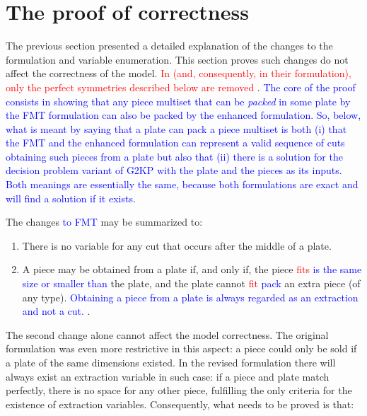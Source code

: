 \documentclass[ppgc,tese,english,formais,babel]{iiufrgs}
\newif\iffinalversion
\newcommand{\newtext}[1]{\iffinalversion%
#1%
\else%
\textcolor{blue}{#1}%
\fi%
}
\newcommand{\oldtext}[1]{\iffinalversion%
\else%
\textcolor{red}{#1}%
\fi%
}
\begin{document}

\section{The proof of correctness}
\label{sec:proof_of_correctness}

The previous section presented a detailed explanation of the changes to the formulation and variable enumeration.
This section proves such changes do not affect the correctness of the model.
\oldtext{In \citet{furini:2016} (and, consequently, in their formulation), only the perfect symmetries described below are removed}.
\newtext{The core of the proof consists in showing that any piece multiset that can be \emph{packed} in some plate by the FMT formulation can also be packed by the enhanced formulation. So, below, what is meant by saying that a plate can pack a piece multiset is both (i) that the FMT and the enhanced formulation can represent a valid sequence of cuts obtaining such pieces from a plate but also that (ii) there is a solution for the decision problem variant of G2KP with the plate and the pieces as its inputs. Both meanings are essentially the same, because both formulations are exact and will find a solution if it exists.}
The changes \newtext{to FMT} may be summarized to:

\begin{enumerate}
\item There is no variable for any cut that occurs after the middle of a plate.
\item A piece may be obtained from a plate if, and only if, the piece \oldtext{fits}\newtext{is the same size or smaller than} the plate, and the plate cannot \oldtext{fit}\newtext{pack} an extra piece (of any type). \newtext{Obtaining a piece from a plate is always regarded as an extraction and not a cut.}.
\end{enumerate}

The second change alone cannot affect the model correctness.
The original formulation was even more restrictive in this aspect:
a piece could only be sold if a plate of the same dimensions existed.
In the revised formulation there will always exist an extraction variable in such case:
if a piece and plate match perfectly, there is no space for any other piece, fulfilling the only criteria for the existence of extraction variables.
Consequently, what needs to be proved is that:
\end{document}
